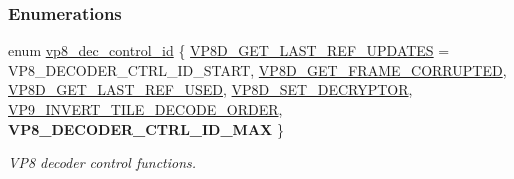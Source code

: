 \subsubsection*{\-Enumerations}
\begin{DoxyCompactItemize}
\item 
enum \hyperlink{group__vp8__decoder_gaf9dd3f2e6d1412106ee791af768e57c1}{vp8\-\_\-dec\-\_\-control\-\_\-id} \{ \*
\hyperlink{group__vp8__decoder_ggaf9dd3f2e6d1412106ee791af768e57c1a0b6055c47120f28e3de959960ee0a02b}{\-V\-P8\-D\-\_\-\-G\-E\-T\-\_\-\-L\-A\-S\-T\-\_\-\-R\-E\-F\-\_\-\-U\-P\-D\-A\-T\-E\-S} =  \-V\-P8\-\_\-\-D\-E\-C\-O\-D\-E\-R\-\_\-\-C\-T\-R\-L\-\_\-\-I\-D\-\_\-\-S\-T\-A\-R\-T, 
\hyperlink{group__vp8__decoder_ggaf9dd3f2e6d1412106ee791af768e57c1af9f82d9e7930e6a2244b30b031b79599}{\-V\-P8\-D\-\_\-\-G\-E\-T\-\_\-\-F\-R\-A\-M\-E\-\_\-\-C\-O\-R\-R\-U\-P\-T\-E\-D}, 
\hyperlink{group__vp8__decoder_ggaf9dd3f2e6d1412106ee791af768e57c1aa57d870ac8cf395fdc86da4a8939b10b}{\-V\-P8\-D\-\_\-\-G\-E\-T\-\_\-\-L\-A\-S\-T\-\_\-\-R\-E\-F\-\_\-\-U\-S\-E\-D}, 
\hyperlink{group__vp8__decoder_ggaf9dd3f2e6d1412106ee791af768e57c1a19729525ca07f7299638f0fd0c9fe320}{\-V\-P8\-D\-\_\-\-S\-E\-T\-\_\-\-D\-E\-C\-R\-Y\-P\-T\-O\-R}, 
\*
\hyperlink{group__vp8__decoder_ggaf9dd3f2e6d1412106ee791af768e57c1a1c4fc468749a2ef88e148f09210ce73c}{\-V\-P9\-\_\-\-I\-N\-V\-E\-R\-T\-\_\-\-T\-I\-L\-E\-\_\-\-D\-E\-C\-O\-D\-E\-\_\-\-O\-R\-D\-E\-R}, 
{\bfseries \-V\-P8\-\_\-\-D\-E\-C\-O\-D\-E\-R\-\_\-\-C\-T\-R\-L\-\_\-\-I\-D\-\_\-\-M\-A\-X}
 \}
\begin{DoxyCompactList}\small\item\em \-V\-P8 decoder control functions. \end{DoxyCompactList}\end{DoxyCompactItemize}
